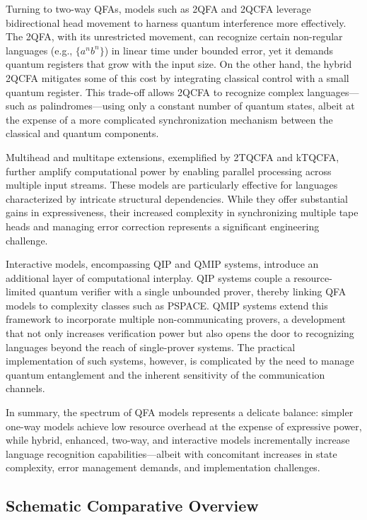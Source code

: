 Turning to two-way QFAs, models such as 2QFA and 2QCFA leverage bidirectional head movement to harness quantum interference more effectively. The 2QFA, with its unrestricted movement, can recognize certain non-regular languages (e.g., \( \{a^n b^n\} \)) in linear time under bounded error, yet it demands quantum registers that grow with the input size. On the other hand, the hybrid 2QCFA mitigates some of this cost by integrating classical control with a small quantum register. This trade-off allows 2QCFA to recognize complex languages—such as palindromes—using only a constant number of quantum states, albeit at the expense of a more complicated synchronization mechanism between the classical and quantum components.

Multihead and multitape extensions, exemplified by 2TQCFA and kTQCFA, further amplify computational power by enabling parallel processing across multiple input streams. These models are particularly effective for languages characterized by intricate structural dependencies. While they offer substantial gains in expressiveness, their increased complexity in synchronizing multiple tape heads and managing error correction represents a significant engineering challenge.

Interactive models, encompassing QIP and QMIP systems, introduce an additional layer of computational interplay. QIP systems couple a resource-limited quantum verifier with a single unbounded prover, thereby linking QFA models to complexity classes such as PSPACE. QMIP systems extend this framework to incorporate multiple non-communicating provers, a development that not only increases verification power but also opens the door to recognizing languages beyond the reach of single-prover systems. The practical implementation of such systems, however, is complicated by the need to manage quantum entanglement and the inherent sensitivity of the communication channels.

\vspace{0.5em}
In summary, the spectrum of QFA models represents a delicate balance: simpler one-way models achieve low resource overhead at the expense of expressive power, while hybrid, enhanced, two-way, and interactive models incrementally increase language recognition capabilities—albeit with concomitant increases in state complexity, error management demands, and implementation challenges.

\subsection*{Schematic Comparative Overview}

